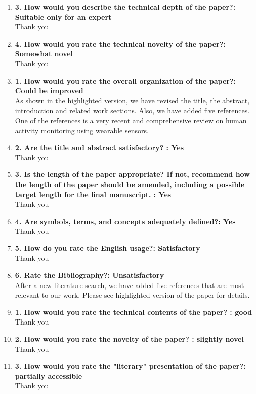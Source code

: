 \documentclass[11pt]{article}
\begin{document}
\begin{enumerate}
\item\textbf{3. How would you describe the technical depth of the paper?: Suitable only for an expert}\\
Thank you

\item\textbf{4. How would you rate the technical novelty of the paper?: Somewhat novel}\\
Thank you

\item \textbf{1. How would you rate the overall organization of the paper?: Could be improved
}\\
As shown in the highlighted version, we have revised the title, the abstract, introduction and related work sections. Also, we have added five references. One of the references is a very recent and comprehensive review on human activity monitoring using wearable sensors.
\item \textbf{2. Are the title and abstract satisfactory? : Yes
}\\
Thank you

\item\textbf{3. Is the length of the paper appropriate? If not, recommend how the length of the paper should be amended, including a possible target length for the final manuscript. : Yes}\\
Thank you

\item\textbf{4. Are symbols, terms, and concepts adequately defined?: Yes}\\
Thank you

\item\textbf{5. How do you rate the English usage?: Satisfactory}\\
Thank you

\item\textbf{6. Rate the Bibliography?: Unsatisfactory}\\
After a new literature search, we have added five references that are most relevant to our work. Please see highlighted version of the paper for details.

\item\textbf{1. How would you rate the technical contents of the paper? : good}\\
Thank you

\item \textbf{2. How would you rate the novelty of the paper? : slightly novel}\\
Thank you

\item\textbf{3. How would you rate the "literary" presentation of the paper?: partially accessible
}\\
Thank you


\end{enumerate}
\end{document}
